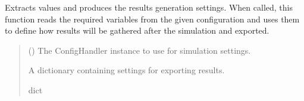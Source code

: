 \documentclass[letterpaper,10pt,english]{sphinxmanual}
\begin{document}
\begin{fulllineitems}
\label{\detokenize{modules/input/config:qnav.input.config.get_results_settings}}
\pysigstartsignatures
{}
\pysigstopsignatures
\sphinxAtStartPar
Extracts values and produces the results generation settings.
When called, this function reads the required variables from the
given configuration and uses them to define how results will be
gathered after the simulation and exported.
\begin{quote}\begin{description}
\sphinxAtStartPar
{} ({\hyperref[\detokenize{modules/input/config_handler:qnav.input.config_handler.ConfigHandler}]{}}) \textendash{} The ConfigHandler instance to use for simulation settings.

\sphinxAtStartPar
A dictionary containing settings for exporting results.

\sphinxAtStartPar
dict

\end{description}\end{quote}

\end{fulllineitems}

\end{document}
